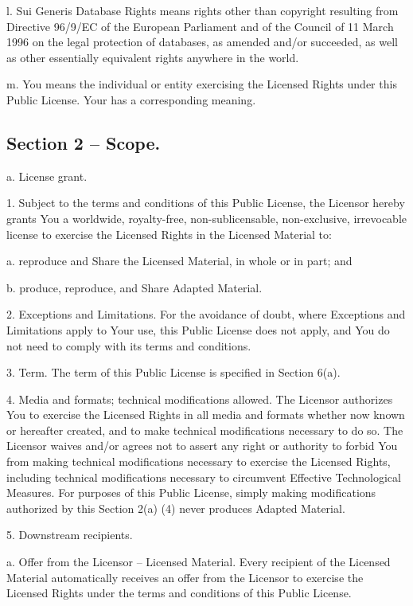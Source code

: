 l. Sui Generis Database Rights means rights other than copyright resulting from Directive 96/9/\+EC of the European Parliament and of the Council of 11 March 1996 on the legal protection of databases, as amended and/or succeeded, as well as other essentially equivalent rights anywhere in the world.

m. You means the individual or entity exercising the Licensed Rights under this Public License. Your has a corresponding meaning.

\subsection*{Section 2 -- Scope.}

a. License grant. \begin{DoxyVerb} 1. Subject to the terms and conditions of this Public License,
    the Licensor hereby grants You a worldwide, royalty-free,
    non-sublicensable, non-exclusive, irrevocable license to
    exercise the Licensed Rights in the Licensed Material to:

      a. reproduce and Share the Licensed Material, in whole or
         in part; and

      b. produce, reproduce, and Share Adapted Material.

 2. Exceptions and Limitations. For the avoidance of doubt, where
    Exceptions and Limitations apply to Your use, this Public
    License does not apply, and You do not need to comply with
    its terms and conditions.

 3. Term. The term of this Public License is specified in Section
    6(a).

 4. Media and formats; technical modifications allowed. The
    Licensor authorizes You to exercise the Licensed Rights in
    all media and formats whether now known or hereafter created,
    and to make technical modifications necessary to do so. The
    Licensor waives and/or agrees not to assert any right or
    authority to forbid You from making technical modifications
    necessary to exercise the Licensed Rights, including
    technical modifications necessary to circumvent Effective
    Technological Measures. For purposes of this Public License,
    simply making modifications authorized by this Section 2(a)
    (4) never produces Adapted Material.

 5. Downstream recipients.

      a. Offer from the Licensor -- Licensed Material. Every
         recipient of the Licensed Material automatically
         receives an offer from the Licensor to exercise the
         Licensed Rights under the terms and conditions of this
         Public License.


\end{DoxyVerb}
